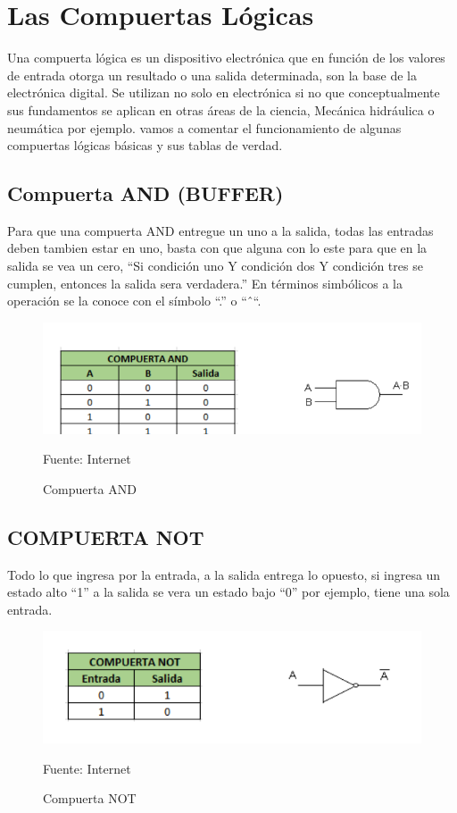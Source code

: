 \section{Las Compuertas Lógicas}

Una compuerta lógica es un dispositivo electrónica que en función de los valores de entrada otorga un resultado o una salida determinada, son la base de la electrónica digital. Se utilizan no solo en electrónica si no que conceptualmente sus fundamentos se aplican en otras áreas de la ciencia, Mecánica hidráulica o neumática por ejemplo. vamos a comentar el funcionamiento de algunas compuertas lógicas básicas y sus tablas de verdad.

\subsection{Compuerta AND (BUFFER)}

Para que una compuerta AND entregue un uno a la salida, todas las entradas deben tambien estar en uno, basta con que alguna con lo este para que en la salida se vea un cero, “Si condición uno Y condición dos Y condición tres se cumplen, entonces la salida sera verdadera.” En términos simbólicos a la operación se la conoce con el símbolo “.” o “ˆ“.
\begin{figure}[H]
    \centering
    \includegraphics[scale = 0.70]{Imagenes/AND.png}
    \caption{Compuerta AND}{Fuente: Internet}
\end{figure}


\subsection{COMPUERTA NOT}
Todo lo que ingresa por la entrada, a la salida entrega lo opuesto, si ingresa un estado alto “1” a la salida se vera un estado bajo “0” por ejemplo, tiene una sola entrada.

\begin{figure}[H]
    \centering
    \includegraphics[scale = 0.70]{Imagenes/NOT.png}
    \caption{Compuerta NOT}{Fuente: Internet}
\end{figure}

